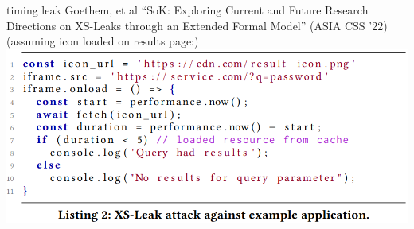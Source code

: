 \begin{frame}{timing leak}
{\scriptsize Goethem, et al ``SoK: Exploring Current and Future Research Directions on XS-Leaks through an Extended Formal Model'' (ASIA CSS '22)}
(assuming icon loaded on results page:) \\
\includegraphics[height=0.85\textheight]{../web/goethem-ex-leak}
\end{frame}
